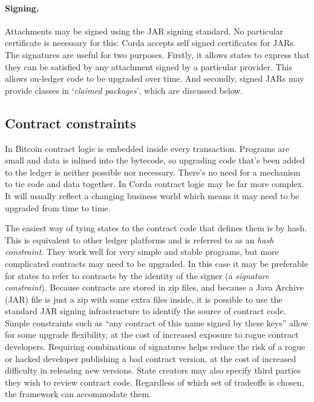 \documentclass{article}
\begin{document}
\paragraph{Signing.}Attachments may be signed using the JAR signing standard. No particular certificate is
necessary for this: Corda accepts self signed certificates for JARs. The signatures are useful for two purposes.
Firstly, it allows states to express that they can be satisfied by any attachment signed by a particular provider.
This allows on-ledger code to be upgraded over time. And secondly, signed JARs may provide classes in
`\emph{claimed packages}', which are discussed below.

\subsection{Contract constraints}\label{sec:contract-constraints}

In Bitcoin contract logic is embedded inside every transaction. Programs are small and data is inlined into the
bytecode, so upgrading code that's been added to the ledger is neither possible nor necessary. There's no need for
a mechanism to tie code and data together. In Corda contract logic may be far more complex. It will usually reflect
a changing business world which means it may need to be upgraded from time to time.

The easiest way of tying states to the contract code that defines them is by hash. This is equivalent to other
ledger platforms and is referred to as an \emph{hash constraint}. They work well for very simple and stable
programs, but more complicated contracts may need to be upgraded. In this case it may be preferable for states to
refer to contracts by the identity of the signer (a \emph{signature constraint}). Because contracts are stored in
zip files, and because a Java Archive (JAR) file is just a zip with some extra files inside, it is possible to use
the standard JAR signing infrastructure to identify the source of contract code. Simple constraints such as ``any
contract of this name signed by these keys'' allow for some upgrade flexibility, at the cost of increased exposure
to rogue contract developers. Requiring combinations of signatures helps reduce the risk of a rogue or hacked
developer publishing a bad contract version, at the cost of increased difficulty in releasing new versions. State
creators may also specify third parties they wish to review contract code. Regardless of which set of tradeoffs is
chosen, the framework can accommodate them.
\end{document}
